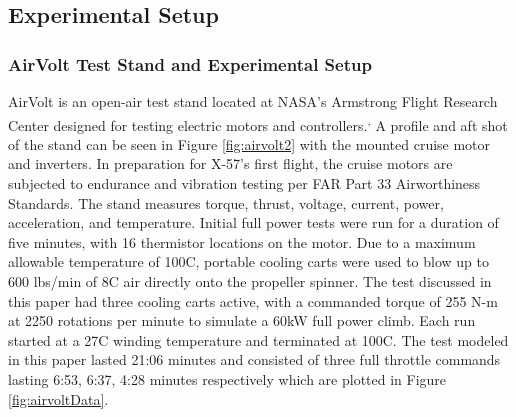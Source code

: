 \documentclass[]{aiaa-tc}%
\begin{document}

\subsection{Experimental Setup}
\subsubsection{AirVolt Test Stand and Experimental Setup}

AirVolt is an open-air test stand located at NASA's Armstrong Flight Research Center designed for testing electric motors and controllers.\cite{Aamod_2015}\textsuperscript{,}\cite{Papathakis}
A profile and aft shot of the stand can be seen in Figure \ref{fig:airvolt2} with the mounted cruise motor and inverters. In preparation for X-57's first flight, the cruise motors are subjected to endurance and vibration testing per FAR Part 33 Airworthiness Standards.
The stand measures torque, thrust, voltage, current, power, acceleration, and temperature. Initial full power tests were run for a duration of five minutes, with 16 thermistor locations on the motor. Due to a maximum allowable temperature of 100\degree C, portable cooling carts were used to blow up to 600 lbs/min of 8\degree C air directly onto the propeller spinner. 
The test discussed in this paper had three cooling carts active, with a commanded torque of 255 N-m at 2250 rotations per minute to simulate a 60kW full power climb. Each run started at a 27\degree C winding temperature and terminated at 100\degree C.
The test modeled in this paper lasted 21:06 minutes and consisted of three full throttle commands lasting 6:53, 6:37, 4:28 minutes respectively which are plotted in Figure \ref{fig:airvoltData}.
\end{document}
